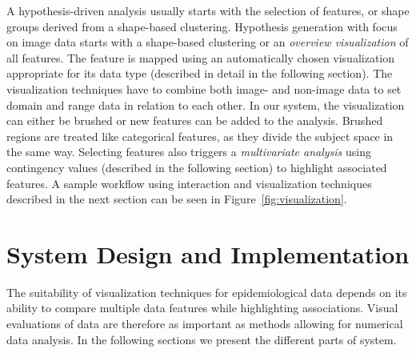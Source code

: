 \documentclass[journal]{style/vgtc} 			          %
\newcommand{\rem}[1]{\textcolor{red}{\sout{#1}}}
\begin{document}
%
A hypothesis-driven analysis usually starts with the selection of features, or shape groups derived from a shape-based clustering.
%
Hypothesis generation with focus on image data starts with a shape-based clustering or an \emph{overview visualization} of all features.
%
The feature is mapped using an automatically chosen visualization appropriate for its data type (described in detail in the following section).
%
The visualization techniques have to combine both image- and non-image data to set domain and range data in relation to each other.
%
In our system, the visualization can either be brushed or new features can be added to the analysis. 
%
%
Brushed regions are treated like categorical features, as they divide the subject space in the same way.
%
Selecting features also triggers a \emph{multivariate analysis} using contingency values (described in the following section) to highlight associated features.  %
%
A sample workflow using interaction and visualization techniques described in the next section can be seen in Figure~\ref{fig:visualization}.

\section{System Design and Implementation} \label{Interaction- and Visualization Techniques}
%
The suitability of visualization techniques for epidemiological data depends on its ability to compare multiple data features while highlighting associations.
%
%
Visual evaluations of data are therefore as important as methods allowing for numerical data analysis.
%
In the following sections we present the different parts of system.
\end{document}
